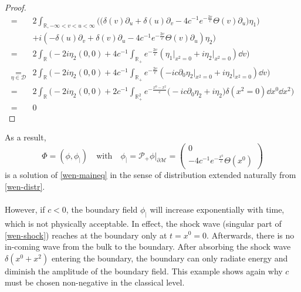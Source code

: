 \begin{proof}
\begin{equation*}
\begin{split}
%
= &2 \int_{\mathbb{R}, -\infty<v<u <\infty}\Big( \big(\delta(v) \partial_u + \delta(u)\partial_v -4c^{-1}e^{-\frac{2v}{c}}\Theta(v)\partial_u)\eta_1 \big)\\
&+ i (-\delta(u)\partial_v + \delta(v)\partial_u-4c^{-1}e^{-\frac{2v}{c}}\Theta(v)\partial_u)\eta_2
\Big)\\ 
%
=& 2\int_{\mathbb{R}}\Big( -2i\eta_2 (0,0) + 4c^{-1}\int_{\mathbb{R}_+}e^{-\frac{2v}{c} }(\eta_1\vert_{x^2 = 0} +i \eta_2\vert_{x^2 = 0}) \dd v\Big) \\ 
%
\underset{\eta\in \mathcal{D}} =& 2\int_{\mathbb{R}}\Big( -2i\eta_2 (0,0) + 4c^{-1}\int_{\mathbb{R}_+}e^{-\frac{2v}{c} }(-ic \partial_0\eta_2\vert_{x^2 = 0} +i\eta_2\vert_{x^2 = 0}) \dd v\Big) \\ 
% 
=& 2\int_{\mathbb{R}}\Big( -2i\eta_2 (0,0) + 2c^{-1}\int_{\mathbb{R}^2_+}e^{-\frac{x^0-x^2} {c} }\big(-ic \partial_0\eta_2 +i\eta_2\big)\delta(x^2 = 0) \dd x^0 \dd x^2\Big) \\ 
=& 0
\end{split}
\end{equation*}
\end{proof}
As a result, 
\begin{equation*}\Phi = (\phi, \phi_|) \quad \mathrm{with}\quad \phi_| = \mathcal{P}_+ \phi\vert_{\partial \mathcal{M}} = 
\begin{pmatrix} 0 \\ -4c^{-1}e^{- \frac{x^0}{c}} \Theta(x^0) \end{pmatrix}
\end{equation*}
 is a solution of \cref{wen-maineq} in the sense of distribution extended naturally from \cref{wen-distr}. \\\\
However, if $c<0$, the boundary field $\phi_|$ will increase exponentially with time, which is not physically acceptable. 
In effect, the shock wave (singular part of \cref{wen-shock}) reaches at the boundary only at $t = x^0 = 0$.
Afterwards, there is no in-coming wave from the bulk to the boundary. 
After absorbing the shock wave $\delta(x^0+x^2)$ entering the boundary,
the boundary can only radiate energy and diminish the amplitude of the boundary field. 
This example shows again why $c$ must be chosen non-negative in the classical level.












